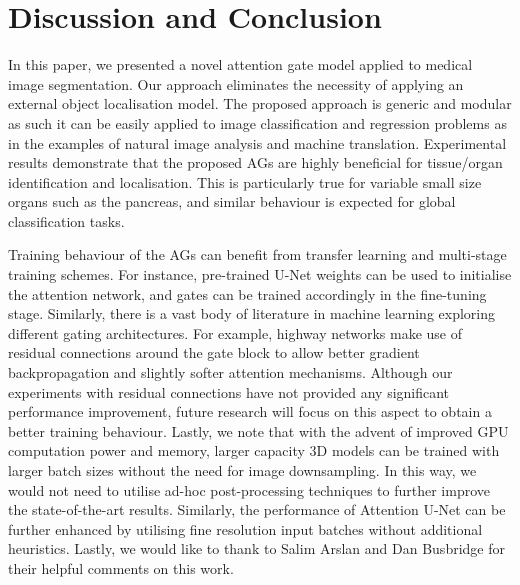 \documentclass{article}
\begin{document}
\section{Discussion and Conclusion}

In this paper, we presented a novel attention gate model applied to medical image segmentation. Our approach eliminates the necessity of applying an external object localisation model. The proposed approach is generic and modular as such it can be easily applied to image classification and regression problems as in the examples of natural image analysis and machine translation. Experimental results demonstrate that the proposed AGs are highly beneficial for tissue/organ identification and localisation. This is particularly true for variable small size organs such as the pancreas, and similar behaviour is expected for global classification tasks. 

Training behaviour of the AGs can benefit from transfer learning and multi-stage training schemes. For instance, pre-trained U-Net weights can be used to initialise the attention network, and gates can be trained accordingly in the fine-tuning stage. Similarly, there is a vast body of literature in machine learning exploring different gating architectures. For example, highway networks \cite{greff2016highway} make use of residual connections around the gate block to allow better gradient backpropagation and slightly softer attention mechanisms. Although our experiments with residual connections have not provided any significant performance improvement, future research will focus on this aspect to obtain a better training behaviour. Lastly, we note that with the advent of improved GPU computation power and memory, larger capacity 3D models can be trained with larger batch sizes without the need for image downsampling. In this way, we would not need to utilise ad-hoc post-processing techniques to further improve the state-of-the-art results. Similarly, the performance of Attention U-Net can be further enhanced by utilising fine resolution input batches without additional heuristics. Lastly, we would like to thank to Salim Arslan and Dan Busbridge for their helpful comments on this work. 



\end{document}

